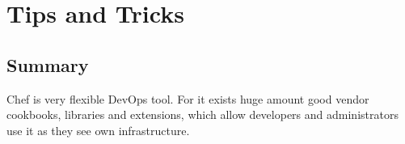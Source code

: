 \chapter{Tips and Tricks}






\section{Summary}

Chef is very flexible DevOps tool. For it exists huge amount good vendor cookbooks, libraries and extensions, which allow developers and administrators use it as they see own infrastructure.